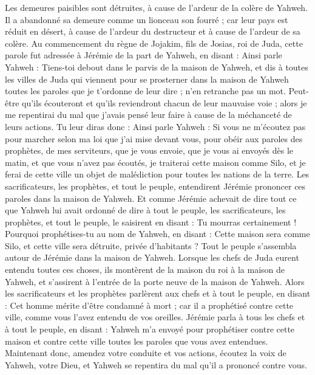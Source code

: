 \begin{multicols}{2}
Les demeures paisibles sont détruites, à cause de l'ardeur de la colère de Yahweh.
Il a abandonné sa demeure comme un lionceau son fourré ; car leur pays est réduit en désert, à cause de l'ardeur du destructeur et à cause de l'ardeur de sa colère.
\VerseOne{}Au commencement du règne de Jojakim, fils de Josias, roi de Juda, cette parole fut adressée à Jérémie de la part de Yahweh, en disant :
Ainsi parle Yahweh : Tiens-toi debout dans le parvis de la maison de Yahweh, et dis à toutes les villes de Juda qui viennent pour se prosterner dans la maison de Yahweh toutes les paroles que je t'ordonne de leur dire ; n'en retranche pas un mot.
Peut-être qu'ils écouteront et qu'ils reviendront chacun de leur mauvaise voie ; alors je me repentirai du mal que j'avais pensé leur faire à cause de la méchanceté de leurs actions.
Tu leur diras donc : Ainsi parle Yahweh : Si vous ne m'écoutez pas pour marcher selon ma loi que j'ai mise devant vous,
pour obéir aux paroles des prophètes, de mes serviteurs, que je vous envoie, que je vous ai envoyés dès le matin, et que vous n'avez pas écoutés,
je traiterai cette maison comme Silo, et je ferai de cette ville un objet de malédiction pour toutes les nations de la terre.
Les sacrificateurs, les prophètes, et tout le peuple, entendirent Jérémie prononcer ces paroles dans la maison de Yahweh.
Et comme Jérémie achevait de dire tout ce que Yahweh lui avait ordonné de dire à tout le peuple, les sacrificateurs, les prophètes, et tout le peuple, le saisirent en disant : Tu mourras certainement !
Pourquoi prophétises-tu au nom de Yahweh, en disant : Cette maison sera comme Silo, et cette ville sera détruite, privée d'habitants ? Tout le peuple s'assembla autour de Jérémie dans la maison de Yahweh.
Lorsque les chefs de Juda eurent entendu toutes ces choses, ils montèrent de la maison du roi à la maison de Yahweh, et s'assirent à l'entrée de la porte neuve de la maison de Yahweh.
Alors les sacrificateurs et les prophètes parlèrent aux chefs et à tout le peuple, en disant : Cet homme mérite d'être condamné à mort ; car il a prophétisé contre cette ville, comme vous l'avez entendu de vos oreilles.
Jérémie parla à tous les chefs et à tout le peuple, en disant : Yahweh m'a envoyé pour prophétiser contre cette maison et contre cette ville toutes les paroles que vous avez entendues.
Maintenant donc, amendez votre conduite et vos actions, écoutez la voix de Yahweh, votre Dieu, et Yahweh se repentira du mal qu'il a prononcé contre vous.

\end{multicols}
